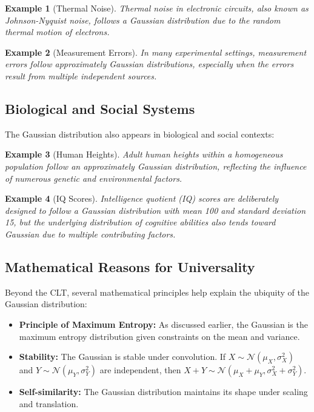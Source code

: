\documentclass{article}
\newtheorem{example}{Example}
\begin{document}
\begin{example}[Thermal Noise]
Thermal noise in electronic circuits, also known as Johnson-Nyquist noise, follows a Gaussian distribution due to the random thermal motion of electrons.
\end{example}

\begin{example}[Measurement Errors]
In many experimental settings, measurement errors follow approximately Gaussian distributions, especially when the errors result from multiple independent sources.
\end{example}

\subsection{Biological and Social Systems}

The Gaussian distribution also appears in biological and social contexts:

\begin{example}[Human Heights]
Adult human heights within a homogeneous population follow an approximately Gaussian distribution, reflecting the influence of numerous genetic and environmental factors.
\end{example}

\begin{example}[IQ Scores]
Intelligence quotient (IQ) scores are deliberately designed to follow a Gaussian distribution with mean 100 and standard deviation 15, but the underlying distribution of cognitive abilities also tends toward Gaussian due to multiple contributing factors.
\end{example}

\subsection{Mathematical Reasons for Universality}

Beyond the CLT, several mathematical principles help explain the ubiquity of the Gaussian distribution:

\begin{itemize}
\item \textbf{Principle of Maximum Entropy:} As discussed earlier, the Gaussian is the maximum entropy distribution given constraints on the mean and variance.
\item \textbf{Stability:} The Gaussian is stable under convolution. If $X \sim \mathcal{N}(\mu_X, \sigma_X^2)$ and $Y \sim \mathcal{N}(\mu_Y, \sigma_Y^2)$ are independent, then $X + Y \sim \mathcal{N}(\mu_X + \mu_Y, \sigma_X^2 + \sigma_Y^2)$.
\item \textbf{Self-similarity:} The Gaussian distribution maintains its shape under scaling and translation.
\end{itemize}
\end{document}
